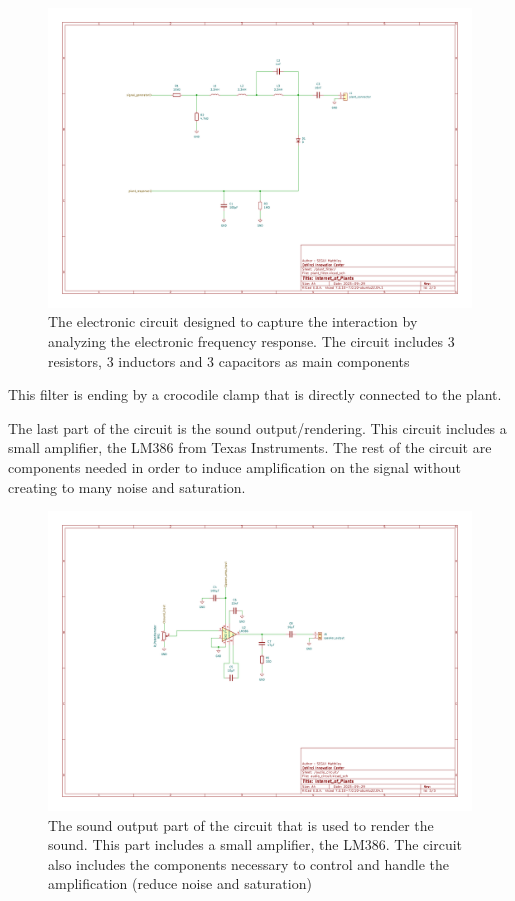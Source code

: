 \begin{figure}[H]
    \centering
    \includegraphics[width=\textwidth]{images/iop-plant_filter.pdf}
    \caption{The electronic circuit designed to capture the interaction by analyzing the electronic
    frequency response. The circuit includes 3 resistors, 3 inductors and 3 capacitors as main components} 
    \vspace{0.1cm}
    \label{fig:iop_schematic_filter}
\end{figure}

This filter is ending by a crocodile clamp that is directly connected to the plant.

The last part of the circuit is the sound output/rendering. This circuit includes a small amplifier,
the LM386 from Texas Instruments. The rest of the circuit are components needed in order to 
induce amplification on the signal without creating to many noise and saturation.

\begin{figure}[H]
    \centering
    \includegraphics[width=\textwidth]{images/iop-audio_circuit.pdf}
    \caption{The sound output part of the circuit that is used to render the sound. 
    This part includes a small amplifier, the LM386. The circuit also includes the components necessary
    to control and handle the amplification (reduce noise and saturation)} 
    \vspace{0.1cm}
    \label{fig:iop_schematic_audio}
\end{figure}

